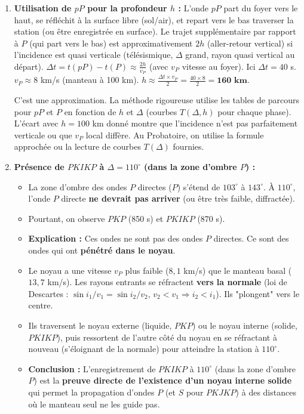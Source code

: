 \documentclass[11pt]{article}
\begin{document}
\begin{exoresolu}
\begin{enumerate}
    \item \textbf{Utilisation de $pP$ pour la profondeur $h$ :}
    L'onde $pP$ part du foyer vers le haut, se réfléchit à la surface libre (sol/air), et repart vers le bas traverser la station (ou être enregistrée en surface).
    Le trajet supplémentaire par rapport à $P$ (qui part vers le bas) est approximativement $2h$ (aller-retour vertical) si l'incidence est quasi verticale (télésismique, $\Delta$ grand, rayon quasi vertical au départ).
    $\Delta t = t(pP) - t(P) \approx \frac{2h}{v_P}$ (avec $v_P$ vitesse au foyer).
    Ici $\Delta t = 40$ s. $v_P \approx 8$ km/s (manteau à 100 km).
    $h \approx \frac{\Delta t \times v_P}{2} = \frac{40 \times 8}{2} = \textbf{160 km}$.
    \begin{attention}C'est une approximation. La méthode rigoureuse utilise les tables de parcours pour $pP$ et $P$ en fonction de $h$ et $\Delta$ (courbes $T(\Delta, h)$ pour chaque phase). L'écart avec $h=100$ km donné montre que l'incidence n'est pas parfaitement verticale ou que $v_P$ local diffère. Au Probatoire, on utilise la formule approchée ou la lecture de courbes $T(\Delta)$ fournies.\end{attention}
    
    \item \textbf{Présence de $PKIKP$ à $\Delta = 110^\circ$ (dans la zone d'ombre $P$) :}
    \begin{itemize}
        \item La zone d'ombre des ondes $P$ directes ($P$) s'étend de $103^\circ$ à $143^\circ$. À $110^\circ$, l'onde $P$ directe \textbf{ne devrait pas arriver} (ou être très faible, diffractée).
        \item Pourtant, on observe $PKP$ (850 s) et $PKIKP$ (870 s).
        \item \textbf{Explication :} Ces ondes ne sont pas des ondes $P$ directes. Ce sont des ondes qui ont \textbf{pénétré dans le noyau}.
        \item Le noyau a une vitesse $v_P$ plus faible ($8,1$ km/s) que le manteau basal ($13,7$ km/s). Les rayons entrants se réfractent \textbf{vers la normale} (loi de Descartes : $\sin i_1 / v_1 = \sin i_2 / v_2$, $v_2 < v_1 \Rightarrow i_2 < i_1$). Ils "plongent" vers le centre.
        \item Ils traversent le noyau externe (liquide, $PKP$) ou le noyau interne (solide, $PKIKP$), puis ressortent de l'autre côté du noyau en se réfractant à nouveau (s'éloignant de la normale) pour atteindre la station à $110^\circ$.
        \item \textbf{Conclusion :} L'enregistrement de $PKIKP$ à $110^\circ$ (dans la zone d'ombre $P$) est la \textbf{preuve directe de l'existence d'un noyau interne solide} qui permet la propagation d'ondes $P$ (et $S$ pour $PKJKP$) à des distances où le manteau seul ne les guide pas.
    \end{itemize}
\end{enumerate}
\end{exoresolu}
\end{document}
